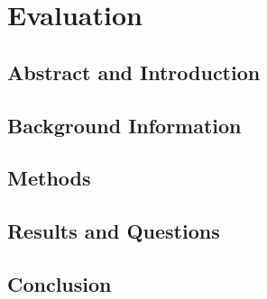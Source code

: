 






\maketitle
\abstract{} \label{sec:abstract}
\thispagestyle{fancy} %


\section{Evaluation} \label{sec:evaluation}


\subsection{Abstract and Introduction} \label{sub:introduction}


\subsection{Background Information} \label{sub:background}


\subsection{Methods} \label{sub:methods}


\subsection{Results and Questions} \label{sub:results}


\subsection{Conclusion} \label{sub:conclusion}


